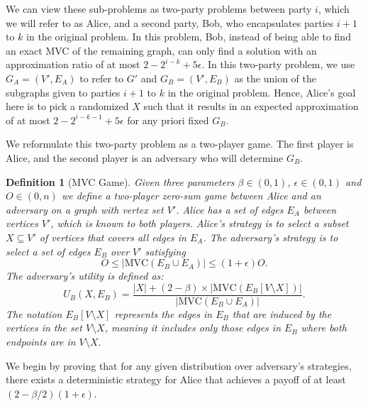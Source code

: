 \documentclass[11pt]{article}
\newtheorem{definition}[theorem]{Definition}
\begin{document}
We can view these sub-problems as two-party problems between party $i$, which we will refer to as Alice, and a second party, Bob, who encapsulates parties $i+1$ to $k$ in the original problem. In this problem, Bob, instead of being able to find an exact MVC of the remaining graph, can only find a solution with an approximation ratio of at most $2-2^{i-k}+5\epsilon$. In this two-party problem, we use $G_A = (V', E_A)$ to refer to $G'$ and $G_B = (V', E_B)$ as the union of the subgraphs given to parties $i+1$ to $k$ in the original problem. Hence, Alice's goal here is to pick a randomized $X$ such that it results in an expected approximation of at most $ 2-2^{i-k-1}+5\epsilon$ for  any priori fixed $G_B$. 

We reformulate this two-party problem as a two-player game. The first player is Alice, and the second player is an adversary who will determine $G_B$. 

\begin{definition}[MVC Game] \label{def:Game} Given three parameters \(\beta \in (0,1)\), $\epsilon\in (0,1)$ and $O\in (0,n)$ we define a two-player zero-sum game between Alice and an adversary on a graph with vertex set \(V'\). Alice has a set of edges \(E_A\) between vertices \(V'\), which is known to both players. Alice's strategy is to select a subset \(X \subseteq V'\) of vertices that covers all edges in \(E_A\). The adversary's strategy is to select a set of edges \(E_B\) over \(V'\) satisfying \[
O\leq |\mathrm{MVC}(E_B \cup E_A)|\leq (1+\epsilon)O.\] The adversary's utility is defined as:
\begin{equation} \label{utility}
    U_B(X, E_B) = \frac{|X| + (2-\beta) \times |\mathrm{MVC}(E_B[V \setminus X])|}{|\mathrm{MVC}(E_B \cup E_A)|}.
\end{equation}
The notation \(E_B[V \setminus X]\) represents the edges in \(E_B\) that are induced by the vertices in the set \(V \setminus X\), meaning it includes only those edges in \(E_B\) where both endpoints are in \(V \setminus X\). 
\end{definition}

We begin by proving that for any given distribution over adversary's
strategies, there exists a deterministic strategy for Alice that
achieves a payoff of at least $(2-\beta/2)(1+\epsilon)$.
\end{document}
